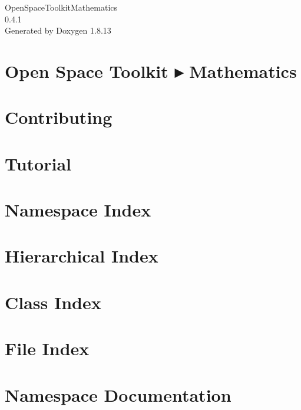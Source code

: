 \documentclass[twoside]{book}
\newcommand{\+}{\discretionary{\mbox{\scriptsize$\hookleftarrow$}}{}{}}
\newcommand{\clearemptydoublepage}{%
  \newpage{\pagestyle{empty}\cleardoublepage}%
}
\begin{document}
\hypersetup{pageanchor=false,
             bookmarksnumbered=true,
             pdfencoding=unicode
            }
\begin{titlepage}
\vspace*{7cm}
\begin{center}%
{\Large Open\+Space\+Toolkit\+Mathematics \\[1ex]\large 0.\+4.\+1 }\\
\vspace*{1cm}
{\large Generated by Doxygen 1.8.13}\\
\end{center}
\end{titlepage}
\clearemptydoublepage
{}
\tableofcontents
\clearemptydoublepage
{}
\hypersetup{pageanchor=true}

\chapter{Open Space Toolkit ▸ Mathematics}
\label{index}\hypertarget{index}{}
\chapter{Contributing}
\label{md__c_o_n_t_r_i_b_u_t_i_n_g}

\chapter{Tutorial}
\label{md_docs__tutorial}

\chapter{Namespace Index}

\chapter{Hierarchical Index}

\chapter{Class Index}

\chapter{File Index}

\chapter{Namespace Documentation}










\end{document}
